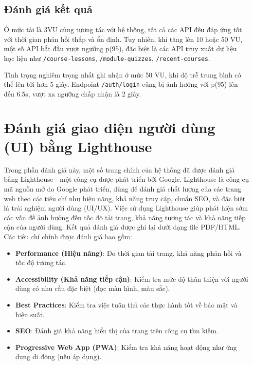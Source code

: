 \subsection{Đánh giá kết quả}

Ở mức tải là 3VU cùng tương tác với hệ thống, tất cả các API đều đáp ứng tốt với thời gian phản hồi thấp và ổn định. Tuy nhiên, khi tăng lên 10 hoặc 50 VU, một số API bắt đầu vượt ngưỡng p(95), đặc biệt là các API truy xuất dữ liệu học liệu như \texttt{/course-lessons}, \texttt{/module-quizzes}, \texttt{/recent-courses}. 

Tình trạng nghiêm trọng nhất ghi nhận ở mức 50 VU, khi độ trễ trung bình có thể lên tới hơn 5 giây. Endpoint \texttt{/auth/login} cũng bị ảnh hưởng với p(95) lên đến 6.5s, vượt xa ngưỡng chấp nhận là 2 giây.

\section{Đánh giá giao diện người dùng (UI) bằng Lighthouse}

Trong phần đánh giá này, một số trang chính của hệ thống đã được đánh giá bằng Lighthouse - một công cụ được phát triển bởi Google.  Lighthouse là công cụ mã nguồn mở do Google phát triển, dùng để đánh giá chất lượng của các trang web theo các tiêu chí như hiệu năng, khả năng truy cập, chuẩn SEO, và đặc biệt là trải nghiệm người dùng (UI/UX). Việc sử dụng Lighthouse giúp phát hiện sớm các vấn đề ảnh hưởng đến tốc độ tải trang, khả năng tương tác và khả năng tiếp cận của người dùng. Kết quả đánh giá được ghi lại dưới dạng file PDF/HTML. Các tiêu chí chính được đánh giá bao gồm:

\begin{itemize}
    \item \textbf{Performance (Hiệu năng)}: Đo thời gian tải trang, khả năng phản hồi và tốc độ tương tác.
    \item \textbf{Accessibility (Khả năng tiếp cận)}: Kiểm tra mức độ thân thiện với người dùng có nhu cầu đặc biệt (đọc màn hình, màu sắc).
    \item \textbf{Best Practices}: Kiểm tra việc tuân thủ các thực hành tốt về bảo mật và hiệu suất.
    \item \textbf{SEO}: Đánh giá khả năng hiển thị của trang trên công cụ tìm kiếm.
    \item \textbf{Progressive Web App (PWA)}: Kiểm tra khả năng hoạt động như ứng dụng di động (nếu áp dụng).
\end{itemize}

